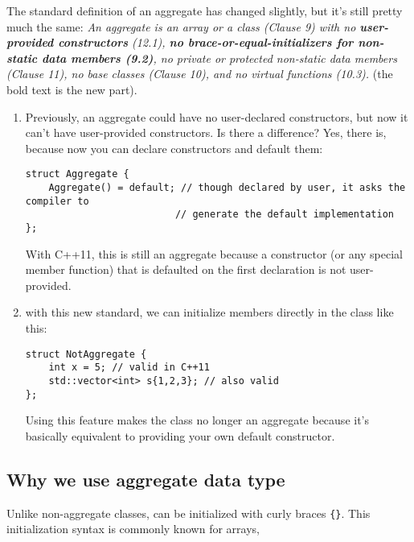The standard definition of an aggregate has changed slightly, but it's still
pretty much the same: 
{\it An aggregate is an array or a class (Clause 9) with no {\bf user-provided
constructors} (12.1), {\bf no brace-or-equal-initializers for non-static data
members (9.2)}, no private or protected non-static data members (Clause 11), no
base classes (Clause 10), and no virtual functions (10.3).  
}  (the bold text is the new part).
\begin{enumerate}
  \item  Previously, an aggregate could have no user-declared constructors, but
  now it can't have user-provided constructors. Is there a difference? Yes,
  there is, because now you can declare constructors and default them:  
  
\begin{verbatim}
struct Aggregate {
    Aggregate() = default; // though declared by user, it asks the compiler to
                          // generate the default implementation
};
\end{verbatim}  

With C++11, this is still an aggregate because a constructor (or any special
member function) that is defaulted on the first declaration is not
user-provided.
  
  \item  with this new standard, we can initialize members directly in the class
  like this:
  
\begin{verbatim}
struct NotAggregate {
    int x = 5; // valid in C++11
    std::vector<int> s{1,2,3}; // also valid
};
\end{verbatim}
Using this feature makes the class no longer an aggregate because it's basically
equivalent to providing your own default constructor.

\end{enumerate}

 

\subsection{Why we use aggregate data type}
\label{sec:aggregate-class-wht-we-use-it}

Unlike non-aggregate classes, can be initialized with curly braces
\verb!{}!. This initialization syntax is commonly known for arrays,

